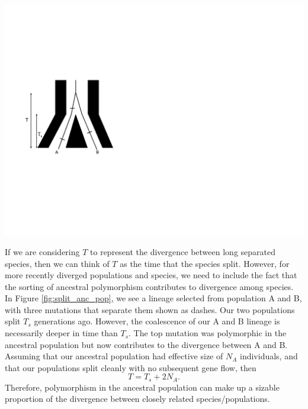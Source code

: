 \begin{marginfigure}
\begin{center}
\includegraphics[width=0.8 \textwidth]{figures/Genetic_drift/ILS/split_anc_pop.pdf}
\end{center}
\caption{} \label{fig:split_anc_pop}  
\end{marginfigure} 


If we are considering $T$ to represent the divergence between long
separated species, then we can think of $T$ as the time that the
species split. However, for more recently diverged populations and
species, we need to include the fact that the sorting of ancestral
polymorphism contributes to divergence among species. In Figure 
\ref{fig:split_anc_pop}, we see a lineage selected from population A
and B, with three mutations that separate them shown as dashes. Our two populations split $T_s$ generations ago.  However, the
coalescence of our A and B lineage is necessarily deeper in time than
$T_s$. The top mutation was polymorphic in the ancestral population
but now contributes to the divergence between A and B. Assuming that
our ancestral population had effective size of $N_A$ individuals, and
that our populations split cleanly with no subsequent gene flow, then
\begin{equation}
T = T_s + 2N_A.
\end{equation}
Therefore, polymorphism in the ancestral population can make up a
sizable proportion of the divergence between closely related
species/populations. 



